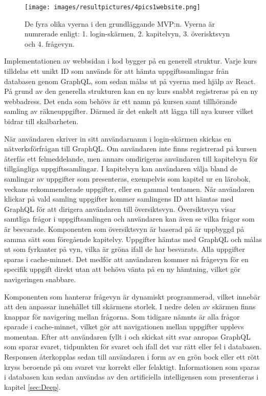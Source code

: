 \begin{figure}[hbtp]
    \centering
    \texttt{[image: images/resultpictures/4pics1website.png]}
    \caption{De fyra olika vyerna i den grundläggande MVP:n. Vyerna är numrerade enligt: 1. login-skärmen, 2. kapitelvyn, 3. överisktsvyn och 4. frågevyn. }
    \label{fig:raket4}
\end{figure}


Implementationen av webbsidan i kod bygger på en generell struktur. Varje kurs tilldelas ett unikt ID som används för att hämta uppgiftssamlingar från databasen genom GraphQL, som sedan målas ut på vyerna med hjälp av React. På grund av den generella strukturen kan en ny kurs snabbt registreras på en ny webbadress. Det enda som behövs är ett namn på kursen samt tillhörande samling av räkneuppgifter. Därmed är det enkelt att lägga till nya kurser vilket bidrar till skalbarheten.

När användaren skriver in sitt användarnamn i login-skärmen skickas en nätverksförfrågan till GraphQL. Om användaren inte finns registrerad på kursen återfås ett felmeddelande, men annars omdirigeras användaren till kapitelvyn för tillgängliga uppgiftssamlingar. I kapitelvyn kan användaren välja bland de samlingar av uppgifter som presenteras, exempelvis som kapitel ur en lärobok, veckans rekommenderade uppgifter, eller en gammal tentamen. När användaren klickar på vald samling uppgifter kommer samlingens ID att hämtas med GraphQL för att dirigera användaren till översiktsvyn. Översiktsvyn visar samtliga frågor i uppgiftsamlingen och användaren kan även se vilka frågor som är besvarade. Komponenten som översiktsvyn är baserad på är uppbyggd på samma sätt som föregående kapitelvy. Uppgifter hämtas med GraphQL och målas ut som fyrkanter på vyn, vilka är gröna ifall de har besvarats. Alla uppgifter sparas i cache-minnet. Det medför att användaren kommer nå frågevyn för en specifik uppgift direkt utan att behöva vänta på en ny hämtning, vilket gör navigeringen snabbare.

Komponenten som hanterar frågevyn är dynamiskt programmerad, vilket innebär att den anpassar innehållet till skärmens storlek. I nedre delen av skärmen finns knappar för navigering mellan frågorna. Som tidigare nämnts är alla frågor sparade i cache-minnet, vilket gör att navigationen mellan uppgifter upplevs momentan. Efter att användaren fyllt i och skickat sitt svar anropas GraphQL som sparar svaret, tidpunkten för svaret och ifall det var rätt eller fel i databasen. Responsen återkopplas sedan till användaren i form av en grön bock eller ett rött kryss beroende på om svaret var korrekt eller felaktigt. Informationen som sparas i databasen kan sedan användas av den artificiella intelligensen som presenteras i kapitel \ref{sec:Deep}.

